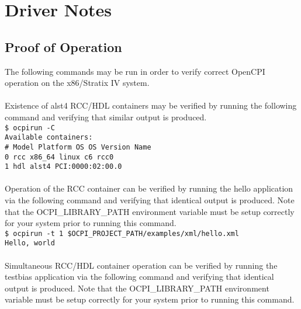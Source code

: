 \documentclass{article}
\newcommand{\terminaloutput}[1]{\texttt{#1}}
\begin{document}
 

\section*{Driver Notes}
 

\subsection*{Proof of Operation}
The following commands may be run in order to verify correct OpenCPI operation on the x86/Stratix IV system.\\ \\
Existence of alst4 RCC/HDL containers may be verified by running the following command and verifying that similar output is produced.\\
\noindent\terminaloutput{\$ ocpirun -C\\
Available containers:\\
 \#  Model\hspace{6ex} Platform\hspace{3ex}    OS\hspace{5ex}     OS Version\hspace{1ex}  Name\\
 0  rcc\hspace{9ex}   x86\_64\hspace{5ex}      linux\hspace{2ex}  c6\hspace{10ex}          rcc0\\
 1  hdl\hspace{9ex}   alst4\hspace{29ex}                          PCI:0000:02:00.0
}\\ \\
Operation of the RCC container can be verified by running the hello application via the following command and verifying that identical output is produced. Note that the OCPI\_LIBRARY\_PATH environment variable must be setup correctly for your system prior to running this command.\\
\noindent\terminaloutput{\$ ocpirun -t 1 \$OCPI\_PROJECT\_PATH/examples/xml/hello.xml \\
Hello, world} \\ \\
Simultaneous RCC/HDL container operation can be verified by running the testbias application via the following command and verifying that identical output is produced. Note that the OCPI\_LIBRARY\_PATH environment variable must be setup correctly for your system prior to running this command.\\
\end{document}
